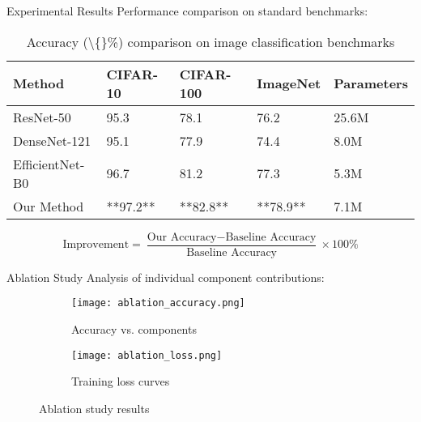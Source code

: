\documentclass[11pt,16:9,handout]{beamer}
\begin{document}
\begin{frame}{Experimental Results}
Performance comparison on standard benchmarks:


\begin{table}[center]
    \centering
    \caption{Accuracy (\textbackslash\{\}\%) comparison on image classification benchmarks}
    \begin{tabular}{lllll}
    \toprule
        Method & CIFAR-10 & CIFAR-100 & ImageNet & Parameters \\
        \midrule
        ResNet-50 & 95.3 & 78.1 & 76.2 & 25.6M \\
        DenseNet-121 & 95.1 & 77.9 & 74.4 & 8.0M \\
        EfficientNet-B0 & 96.7 & 81.2 & 77.3 & 5.3M \\
        Our Method & **97.2** & **82.8** & **78.9** & 7.1M \\
        \bottomrule
    \end{tabular}
    
    \label{tab:results}
\end{table}


\begin{equation}
\text{Improvement} = \frac{\text{Our Accuracy} - \text{Baseline Accuracy}}{\text{Baseline Accuracy}} \times 100\%
\end{equation}

\end{frame}



\begin{frame}{Ablation Study}
Analysis of individual component contributions:


\begin{figure}[center]
    \centering
    
    \begin{subfigure}[b]{0.48\textwidth}
        \centering
        \texttt{[image: ablation\_accuracy.png]}
        \caption{Accuracy vs. components}
        
    \end{subfigure}

    \begin{subfigure}[b]{0.48\textwidth}
        \centering
        \texttt{[image: ablation\_loss.png]}
        \caption{Training loss curves}
        
    \end{subfigure}
    \caption{Ablation study results}
    \label{fig:ablation}
\end{figure}


\end{frame}
\end{document}

